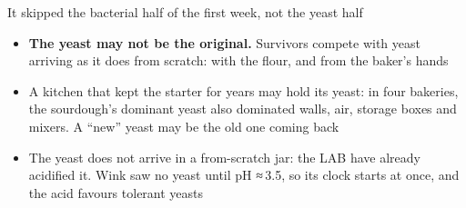 \documentclass[aspectratio=169,11pt]{beamer}
\newcommand{\caveat}[1]{\flagtag{flag}{#1}}
\begin{document}
\begin{frame}{It skipped the bacterial half of the first week, not the yeast half}
  \small
  \begin{itemize}
    \item \textbf{The yeast may not be the original.} Survivors compete with yeast arriving as it does from scratch: with the flour, and from the baker's hands
    \item A kitchen that kept the starter for years may hold its yeast: in four bakeries, the sourdough's dominant yeast also dominated walls, air, storage boxes and mixers. A ``new'' yeast may be the old one coming back \caveat{loose analogue}
    \item The yeast does not arrive in a from-scratch jar: the LAB have already acidified it. Wink saw no yeast until pH ≈\,3.5, so its clock starts at once, and the acid favours tolerant yeasts
  \end{itemize}
\end{frame}
\end{document}
